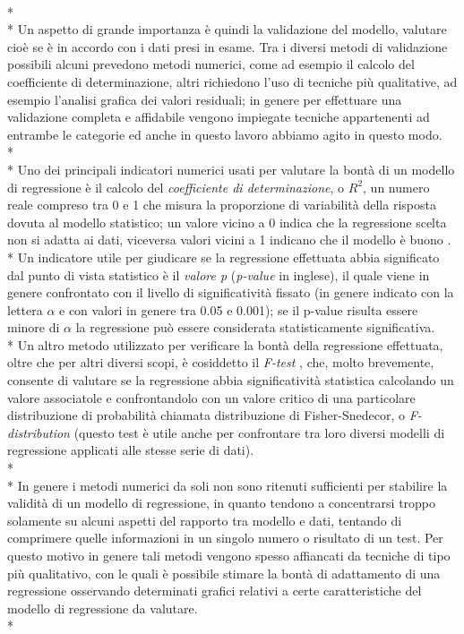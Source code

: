 \documentclass[12pt,a4paper,openright,twoside]{report}
\begin{document}
\\*\\*
Un aspetto di grande importanza è quindi la validazione del modello, valutare cioè se è in accordo con i dati presi in esame. Tra i diversi metodi di validazione possibili alcuni prevedono metodi numerici, come ad esempio il calcolo del coefficiente di determinazione, altri richiedono l'uso di tecniche più qualitative, ad esempio l'analisi grafica dei valori residuali; in genere per effettuare una validazione completa e affidabile vengono impiegate tecniche appartenenti ad entrambe le categorie ed anche in questo lavoro abbiamo agito in questo modo.\\*\\*
Uno dei principali indicatori numerici usati per valutare la bontà di un modello di regressione è il calcolo del \emph{coefficiente di determinazione}, o $R^2$, un numero reale compreso tra 0 e 1 che misura la proporzione di variabilità della risposta dovuta al modello statistico; un valore vicino a 0 indica che la regressione scelta non si adatta ai dati, viceversa valori vicini a 1 indicano che il modello è buono \cite{principleStats,regressionAnalysis}. \\*
Un indicatore utile per giudicare se la regressione effettuata abbia significato dal punto di vista statistico è il  \emph{valore p} (\emph{p-value} in inglese), il quale viene in genere confrontato con il livello di significatività fissato (in genere indicato con la lettera $\alpha$ e con valori in genere tra 0.05 e 0.001); se il p-value risulta essere minore di $\alpha$ la regressione può essere considerata statisticamente significativa.\\*
Un altro metodo utilizzato per verificare la bontà della regressione effettuata, oltre che per altri diversi scopi, è cosiddetto il \emph{F-test} \cite{fisher1925,box1953}, che, molto brevemente, consente di valutare se la regressione abbia significatività statistica calcolando un valore associatole e confrontandolo con un valore critico di una particolare distribuzione di probabilità chiamata  distribuzione di Fisher-Snedecor, o \emph{F-distribution} (questo test è utile anche per confrontare tra loro diversi modelli di regressione applicati alle stesse serie di dati).\\*\\*
In genere i metodi numerici da soli non sono ritenuti sufficienti per stabilire la validità di un modello di regressione, in quanto tendono a concentrarsi troppo solamente su alcuni aspetti del rapporto tra modello e dati, tentando di comprimere quelle informazioni in un singolo numero o risultato di un test. Per questo motivo in genere  tali metodi vengono spesso affiancati da tecniche di tipo più qualitativo, con le quali è possibile stimare la bontà di adattamento di una regressione osservando determinati grafici relativi a certe caratteristiche del modello di regressione da valutare.\\*
\end{document}
